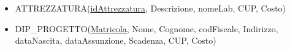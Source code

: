 \begin{itemize}
\begin{description}
                \end{description}
            \item ATTREZZATURA(\underline{idAttrezzatura}, Descrizione, nomeLab, CUP, Costo)
            \item DIP\_PROGETTO(\underline{Matricola}, Nome, Cognome, codFiscale, Indirizzo, dataNascita, dataAssunzione, Scadenza, CUP, Costo)
            \end{itemize}